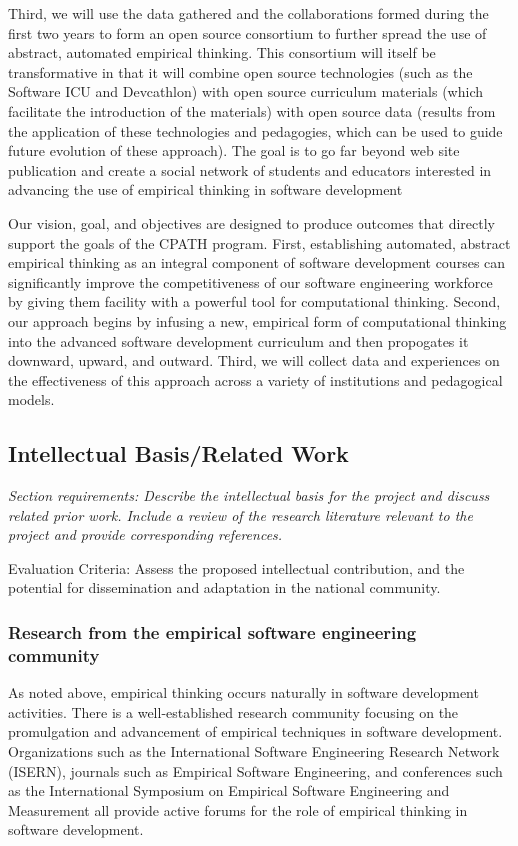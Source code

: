 Third, we will use the data gathered and the collaborations formed during
the first two years to form an open source consortium to further spread the
use of abstract, automated empirical thinking.  This consortium will itself
be transformative in that it will combine open source technologies (such as
the Software ICU and Devcathlon) with open source curriculum materials
(which facilitate the introduction of the materials) with open source data
(results from the application of these technologies and pedagogies, which
can be used to guide future evolution of these approach).  The goal is to
go far beyond web site publication and create a social network of students
and educators interested in advancing the use of empirical thinking in
software development

Our vision, goal, and objectives are designed to produce outcomes that
directly support the goals of the CPATH program.  First, establishing
automated, abstract empirical thinking as an integral component of software
development courses can significantly improve the competitiveness of our
software engineering workforce by giving them facility with a powerful tool
for computational thinking.  Second, our approach begins by infusing a new,
empirical form of computational thinking into the advanced software
development curriculum and then propogates it downward, upward, and
outward.  Third, we will collect data and experiences on the effectiveness
of this approach across a variety of institutions and pedagogical models.

\subsection{Intellectual Basis/Related Work}

{\em Section requirements: Describe the intellectual basis for the project
and discuss related prior work.  Include a review of the research
literature relevant to the project and provide corresponding references.

Evaluation Criteria: Assess the proposed intellectual contribution, and the
potential for dissemination and adaptation in the national community.}
\bigskip

\subsubsection{Research from the empirical software engineering community}

As noted above, empirical thinking occurs naturally in software development
activities.  There is a well-established research community focusing on the
promulgation and advancement of empirical techniques in software
development.  Organizations such as the International Software Engineering
Research Network (ISERN), journals such as Empirical Software Engineering,
and conferences such as the International Symposium on Empirical Software
Engineering and Measurement all provide active forums for the role of
empirical thinking in software development.

